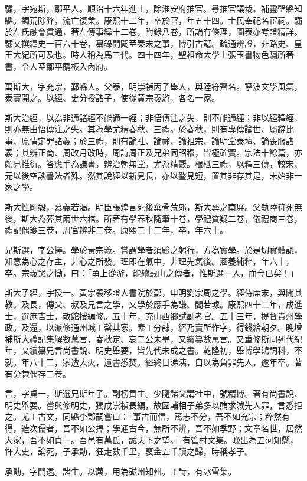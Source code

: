 \begin{pinyinscope}
驌，字宛斯，鄒平人。順治十六年進士，除淮安府推官。尋推官議裁，補靈壁縣知縣。蠲荒除弊，流亡復業。康熙十二年，卒於官，年五十四。士民奉祀名宦祠。驌於左氏融會貫通，著左傳事緯十二卷，附錄八卷，所論有條理，圖表亦考證精詳。驌又撰繹史一百六十卷，纂錄開闢至秦末之事，博引古籍。疏通辨證，非路史、皇王大紀所可及也。時人稱為馬三代。四十四年，聖祖命大學士張玉書物色驌所著書，令人至鄒平購板入內府。

萬斯大，字充宗，鄞縣人。父泰，明崇禎丙子舉人，與陸符齊名。寧波文學風氣，泰實開之。以經、史分授諸子，使從黃宗羲游，各名一家。

斯大治經，以為非通諸經不能通一經；非悟傳注之失，則不能通經；非以經釋經，則亦無由悟傳注之失。其為學尤精春秋、三禮。於春秋，則有專傳論世、屬辭比事、原情定罪諸義；於三禮，則有論社、論禘、論祖宗、論明堂泰壇、論喪服諸義；其辨正商、周改月改時，周詩周正及兄弟同昭穆，皆極確實。宗法十餘篇，亦頗見推衍。答應手為謙書，辨治朝無堂，尤為精覈。根柢三禮，以釋三傳，較宋、元以後空談書法者殊。然其說經以新見長，亦以鑿見短，置其非存其是，未始非一家之學。

斯大性剛毅，慕義若渴。明臣張煌言死後棄骨荒郊，斯大葬之南屏。父執陸符死無後，斯大為葬其兩世六棺。所著有學春秋隨筆十卷，學禮質疑二卷，儀禮商三卷，禮記偶箋三卷，周官辨非二卷。康熙二十二年，卒，年六十。

兄斯選，字公擇。學於黃宗羲。嘗謂學者須驗之躬行，方為實學。於是切實體認，知意為心之存主，非心之所發。理即在氣中，非理先氣後。涵養純粹，年六十，卒。宗羲哭之慟，曰：「甬上從游，能續蕺山之傳者，惟斯選一人，而今已矣！」

斯大子經，字授一。黃宗羲移證人書院於鄞，申明劉宗周之學。經侍席末，與聞其教。及長，傳父、叔及兄言之學，又學於應手為謙、閻若璩。康熙四十二年，成進士，選庶吉士，散館授編修。五十年，充山西鄉試副考官。五十三年，提督貴州學政。及還，以派修通州城工罄其家。素工分隸，經乃賣所作字，得錢給朝夕。晚增補斯大禮記集解數萬言，春秋定、哀二公未畢，又續纂數萬言。又重修斯同列代紀年，又續纂兄言尚書說、明史舉要，皆先代未成之書。乾隆初，舉博學鴻詞科，不就。年八十二，家遭大火，遺書悉焚。經終日涕洟，自以為負罪先人，逾年卒。著有分隸偶存二卷。

言，字貞一，斯選兄斯年子。副榜貢生。少隨諸父講社中，號精博。著有尚書說、明史舉要。嘗與修明史，獨成崇禎長編，故國輔相子弟多以賄求減先人罪，言悉拒之。尤工古文，同縣李鄴嗣嘗曰：「事古而信，篤志不分，吾不如充宗；粹然有得，造次儒者，吾不如公擇；學通古今，無所不辨，吾不如季野；文章名世，居然大家，吾不如貞一。吾邑有萬氏，誠天下之望。」有管村文集。晚出為五河知縣，忤大吏，論死，子承勛，狂走數千里，裒金五千贖之歸，時稱孝子。

承勛，字開遠。諸生。以薦，用為磁州知州。工詩，有冰雪集。


\end{pinyinscope}
